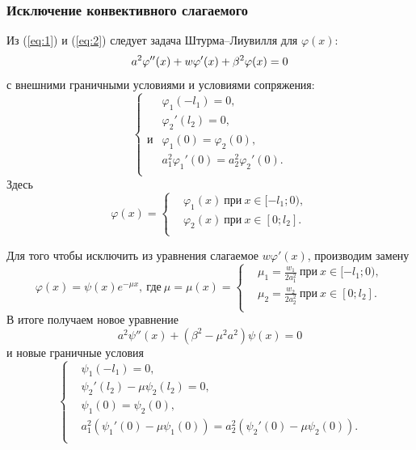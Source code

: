 \documentclass[12pt, a4paper]{article}
\begin{document}
\subsubsection{Исключение конвективного слагаемого}
Из (\ref{eq:1}) и (\ref{eq:2}) следует задача Штурма--Лиувилля для $\varphi(x)$:
\begin{equation}
  a^2 \varphi''(x) + w \varphi'(x) + \beta^2\varphi(x)=0 \\
\end{equation}
с внешними граничными условиями и условиями сопряжения:
\begin{equation}
  \left\{
  \begin{aligned}
    & \varphi_1(-l_1) = 0, \\
    & \varphi_2'(l_2) = 0, \\
и   & \varphi_1(0) = \varphi_2(0), \\
    & a_1^2 \varphi_1'(0) = a_2^2 \varphi_2'(0). \\
  \end{aligned}
  \right.
  \label{eq:16}
\end{equation}
Здесь
\begin{equation}
  \varphi(x)=\left\{ 
    \begin{aligned}
      & \varphi_1(x)\ \text{при}\ x \in [-l_1;0), \\
      & \varphi_2(x)\ \text{при}\ x \in [0;l_2]. \\
    \end{aligned}
\right.
\end{equation}

Для того чтобы исключить из уравнения слагаемое $w\varphi'(x)$, производим замену 
\begin{equation}
  \varphi(x) = \psi(x) e^{- \mu x},\ \text{где}\ \mu=\mu(x) = \left\{
    \begin{aligned}
      & \mu_1 = \frac{w_1}{2a_1^2}\ \text{при}\ x \in [-l_1;0), \\
      & \mu_2 = \frac{w_2}{2a_2^2}\ \text{при}\ x \in [0;l_2]. \\
    \end{aligned}
    \right.
\end{equation}
В итоге получаем новое уравнение
\begin{equation}
  a^2\psi''(x) + (\beta^2 - \mu^2a^2) \psi(x) = 0
  \label{eq:3}
\end{equation}
и новые граничные условия
\begin{equation}
  \left\{
  \begin{aligned}
    & \psi_1(-l_1) = 0, \\
    & \psi_2'(l_2) - \mu\psi_2(l_2) = 0, \\
    & \psi_1(0) = \psi_2(0), \\
    & a_1^2(\psi_1'(0) - \mu\psi_1(0)) =  a_2^2(\psi_2'(0) - \mu\psi_2(0)). \\
  \end{aligned}
  \right.
  \label{}
\end{equation}
\end{document}
